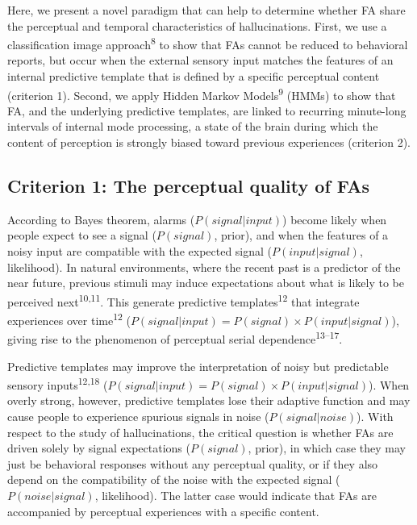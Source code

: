 \documentclass[
]{article}
\begin{document}
Here, we present a novel paradigm that can help to determine whether FA
share the perceptual and temporal characteristics of hallucinations.
First, we use a classification image approach\textsuperscript{8} to show
that FAs cannot be reduced to behavioral reports, but occur when the
external sensory input matches the features of an internal predictive
template that is defined by a specific perceptual content (criterion 1).
Second, we apply Hidden Markov Models\textsuperscript{9} (HMMs) to show
that FA, and the underlying predictive templates, are linked to
recurring minute-long intervals of internal mode processing, a state of
the brain during which the content of perception is strongly biased
toward previous experiences (criterion 2).

\hypertarget{criterion-1-the-perceptual-quality-of-fas}{%
\subsection{Criterion 1: The perceptual quality of
FAs}\label{criterion-1-the-perceptual-quality-of-fas}}

According to Bayes theorem, alarms (\(P(signal|input)\)) become likely
when people expect to see a signal (\(P(signal)\), prior), and when the
features of a noisy input are compatible with the expected signal
(\(P(input|signal)\), likelihood). In natural environments, where the
recent past is a predictor of the near future, previous stimuli may
induce expectations about what is likely to be perceived
next\textsuperscript{10,11}. This generate predictive
templates\textsuperscript{12} that integrate experiences over
time\textsuperscript{12}
(\(P(signal|input) = P(signal) \times P(input|signal)\)), giving rise to
the phenomenon of perceptual serial dependence\textsuperscript{13--17}.

Predictive templates may improve the interpretation of noisy but
predictable sensory inputs\textsuperscript{12,18}
(\(P(signal|input) = P(signal) \times P(input|signal)\)). When overly
strong, however, predictive templates lose their adaptive function and
may cause people to experience spurious signals in noise
(\(P(signal|noise)\)). With respect to the study of hallucinations, the
critical question is whether FAs are driven solely by signal
expectations (\(P(signal)\), prior), in which case they may just be
behavioral responses without any perceptual quality, or if they also
depend on the compatibility of the noise with the expected signal
(\(P(noise|signal)\), likelihood). The latter case would indicate that
FAs are accompanied by perceptual experiences with a specific content.
\end{document}
